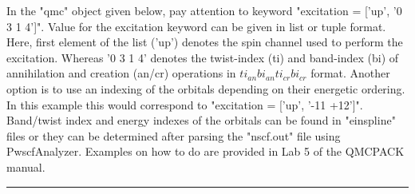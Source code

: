 \documentclass[oneside,11pt]{memoir}
\numberwithin{equation}{section}
\newcommand{\HRule}{\rule{\linewidth}{0.5mm}}
\begin{document}
In the "qmc" object given below, pay attention to keyword "excitation   = ['up', '0 3 1 4']". Value for the excitation keyword can be given in list or tuple format. Here, first element of the list ('up') denotes the spin channel used to perform the excitation. Whereas '0 3 1 4' denotes the twist-index (ti) and band-index (bi) of annihilation and creation (an/cr) operations in $ti_{an} bi_{an} ti_{cr} bi_{cr}$ format. Another option is to use an indexing of the orbitals depending on their energetic ordering. In this example this would correspond to "excitation   = ['up', '-11 +12']". Band/twist index and energy indexes of the orbitals can be found in "einspline" files or they can be determined after parsing the "nscf.out" file using PwscfAnalyzer. Examples on how to do are provided in Lab 5 of the QMCPACK manual.\\
\HRule
\end{document}
